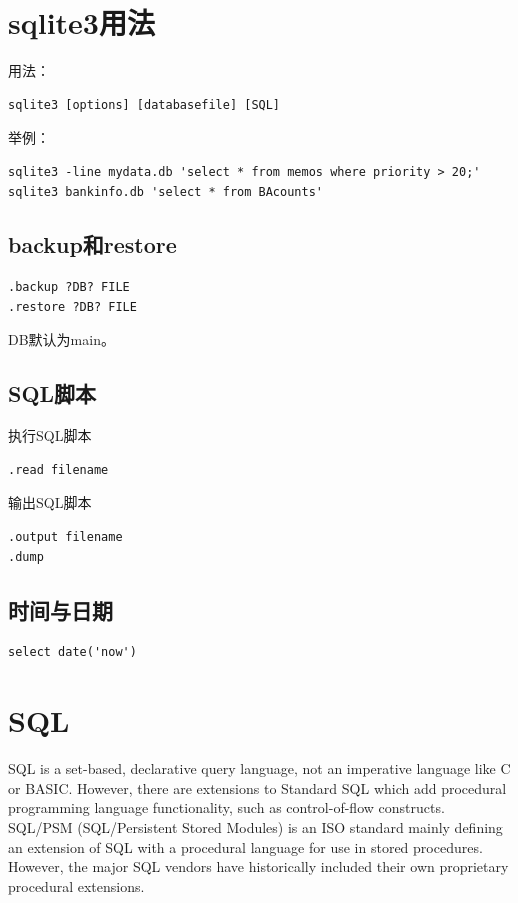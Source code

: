 \section{sqlite3用法}
用法：
\begin{verbatim}
sqlite3 [options] [databasefile] [SQL]
\end{verbatim}

举例：
\begin{verbatim}
sqlite3 -line mydata.db 'select * from memos where priority > 20;'
sqlite3 bankinfo.db 'select * from BAcounts'
\end{verbatim}

\subsection{backup和restore}
\begin{verbatim}
.backup ?DB? FILE
.restore ?DB? FILE 
\end{verbatim}
DB默认为main。

\subsection{SQL脚本}
执行SQL脚本
\begin{verbatim}
.read filename
\end{verbatim}

输出SQL脚本
\begin{verbatim}
.output filename 
.dump
\end{verbatim}

\subsection{时间与日期}

\begin{verbatim}
select date('now')
\end{verbatim}

\section{SQL}

SQL is a set-based, declarative query language, not an imperative language like C or BASIC. However, there are extensions to Standard SQL which add procedural programming language functionality, such as control-of-flow constructs. SQL/PSM (SQL/Persistent Stored Modules) is an ISO standard mainly defining an extension of SQL with a procedural language for use in stored procedures. However, the major SQL vendors have historically included their own proprietary procedural extensions. 

